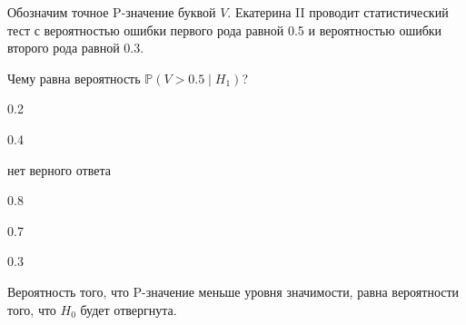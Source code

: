 
\begin{question}
Обозначим точное P-значение буквой \(V\).
Екатерина II проводит статистический тест с вероятностью ошибки первого рода равной 0.5
и вероятностью ошибки второго рода равной 0.3.

Чему равна вероятность \(\mathbb{P} (V > 0.5 \mid H_1)\)?
\begin{answerlist}
  \item 0.2
  \item 0.4
  \item нет верного ответа
  \item 0.8
  \item 0.7
  \item 0.3
\end{answerlist}
\end{question}

\begin{solution}
Вероятность того, что P-значение меньше уровня значимости, равна вероятности того,
что \(H_0\) будет отвергнута.
\end{solution}

